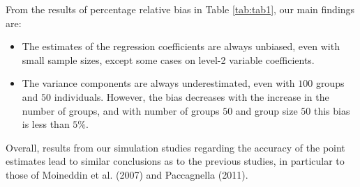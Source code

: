 \documentclass[12pt,oneside,a4paper]{reedthesis}
\begin{document}
From the results of percentage relative bias in Table \ref{tab:tab1}, our main findings are:
\begin{itemize}
\item
  The estimates of the regression coefficients are always unbiased, even with small sample sizes, except some cases on level-2 variable coefficients.
\item
  The variance components are always underestimated, even with \(100\) groups and \(50\) individuals. However, the bias decreases with the increase in the number of groups, and with number of groups \(50\) and group size \(50\) this bias is less than \(5\%\).
\end{itemize}
Overall, results from our simulation studies regarding the accuracy of the point estimates lead to similar conclusions as to the previous studies, in particular to those of Moineddin et al. (2007) and Paccagnella (2011).
\end{document}
